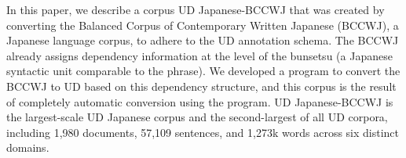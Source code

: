 In this paper, we describe a corpus UD Japanese-BCCWJ that was created by converting the Balanced Corpus of Contemporary Written Japanese (BCCWJ), a Japanese language corpus, to adhere to the UD annotation schema. The BCCWJ already assigns dependency information at the level of the bunsetsu (a Japanese syntactic unit comparable to the phrase). We developed a program to convert the BCCWJ to UD based on this dependency structure, and this corpus is the result of completely automatic conversion using the program. UD Japanese-BCCWJ is the largest-scale UD Japanese corpus and the second-largest of all UD corpora, including 1,980 documents, 57,109 sentences, and 1,273k words across six distinct domains.
